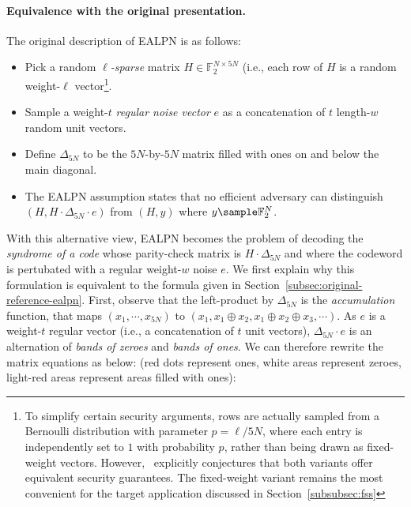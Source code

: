 \documentclass[journal=tosc,submission]{iacrtrans}
\theoremstyle{theorem}
\newcommand\F{\mathbb{F}}
\begin{document}
\paragraph{Equivalence with the original presentation.} The original description of {\sf EALPN} is as follows:
\begin{itemize}
	\item Pick a random \emph{$\ell$-sparse} matrix $H \in \F_2^{N\times 5N}$ (i.e., each row of $H$ is a random weight-$\ell$ vector\footnote{To simplify certain security arguments, rows are actually sampled from a Bernoulli distribution with parameter $p = \ell / 5N$, where each entry is independently set to $1$ with probability $p$, rather than being drawn as fixed-weight vectors. However,~\cite[Section~3.4]{C:BCGIKR22} explicitly conjectures that both variants offer equivalent security guarantees. The fixed-weight variant remains the most convenient for the target application discussed in Section~\ref{subsubsec:fss}}.
	\item Sample a weight-$t$ \emph{regular noise vector} $e$ as a concatenation of $t$ length-$w$ random unit vectors.
	\item Define $\Delta_{5N}$ to be the $5N$-by-$5N$ matrix filled with ones on and below the main diagonal.
	\item The {\sf EALPN} assumption states that no efficient adversary can distinguish $(H, H\cdot \Delta_{5N} \cdot e)$ from $(H, y)$ where $y \sample \F_2^{N}$.
\end{itemize}

With this alternative view, {\sf EALPN} becomes the problem of decoding the \emph{syndrome of a code} whose parity-check matrix is $H\cdot \Delta_{5N}$ and where the codeword is pertubated with a regular weight-$w$ noise $e$. We first explain why this formulation is equivalent to the formula given in Section~\ref{subsec:original-reference-ealpn}. First, observe that the left-product by $\Delta_{5N}$ is the \emph{accumulation} function, that maps $(x_1, \cdots, x_{5N})$ to $(x_1, x_1\oplus x_2, x_1\oplus x_2 \oplus x_3, \cdots)$. As $e$ is a weight-$t$ regular vector (i.e., a concatenation of $t$ unit vectors), $\Delta_{5N}\cdot e$ is an alternation of \emph{bands of zeroes} and \emph{bands of ones}. We can therefore rewrite the matrix equations as below: (red dots represent ones, white areas represent zeroes, light-red areas represent areas filled with ones):
\end{document}

